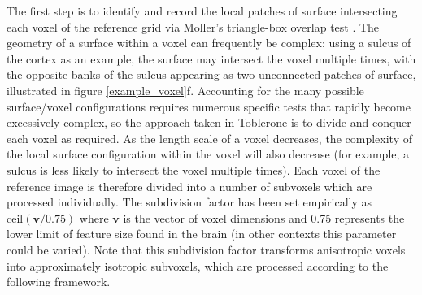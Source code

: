 \documentclass[12pt]{report}
\renewcommand{\vec}[1]{\mathbf{#1}}
\begin{document}
The first step is to identify and record the local patches of surface intersecting each voxel of the reference grid via Moller’s triangle-box overlap test \cite{Akenine-Moller2001}. The geometry of a surface within a voxel can frequently be complex: using a sulcus of the cortex as an example, the surface may intersect the voxel multiple times, with the opposite banks of the sulcus appearing as two unconnected patches of surface, illustrated in figure \ref{example_voxel}f. Accounting for the many possible surface/voxel configurations requires numerous specific tests that rapidly become excessively complex, so the approach taken in Toblerone is to divide and conquer each voxel as required. As the length scale of a voxel decreases, the complexity of the local surface configuration within the voxel will also decrease (for example, a sulcus is less likely to intersect the voxel multiple times). Each voxel of the reference image is therefore divided into a number of subvoxels which are processed individually. The subdivision factor has been set empirically as $\mathrm{ceil}(\vec{v} / 0.75)$ where $\vec{v}$ is the vector of voxel dimensions and 0.75 represents the lower limit of feature size found in the brain (in other contexts this parameter could be varied). Note that this subdivision factor transforms anisotropic voxels into approximately isotropic subvoxels,  which are processed according to the following framework. 
\end{document}
